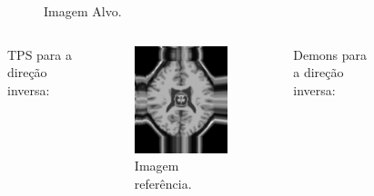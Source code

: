 \documentclass[t]{beamer}
\begin{document}
\begin{frame}
\begin{columns}[c]
\begin{figure}[!h]
\begin{center}
            \caption{Imagem Alvo.}
          \end{center}
        \end{figure}
    \end{columns}
\end{frame}

\begin{frame}
   \begin{columns}[c]
        TPS para a direção inversa:
        \begin{figure}[!h]
          \begin{center}
            \includegraphics[width=0.9\textwidth]{../images/resultDist.png}
            \caption{Imagem referência.}
          \end{center}
        \end{figure}
       Demons para a direção inversa:
        \begin{figure}[!h]
          \begin{center}

\end{center}
\end{figure}
\end{columns}
\end{frame}
\end{document}
